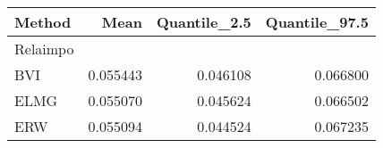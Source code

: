 \begin{table}[ht]
\centering
\begin{tabular}{lrrr}
  \hline
Method & Mean & Quantile\_2.5 & Quantile\_97.5 \\ 
  \hline
Relaimpo &  &  &  \\ 
  BVI & 0.055443 & 0.046108 & 0.066800 \\ 
  ELMG & 0.055070 & 0.045624 & 0.066502 \\ 
  ERW & 0.055094 & 0.044524 & 0.067235 \\ 
   \hline
\end{tabular}
\end{table}
